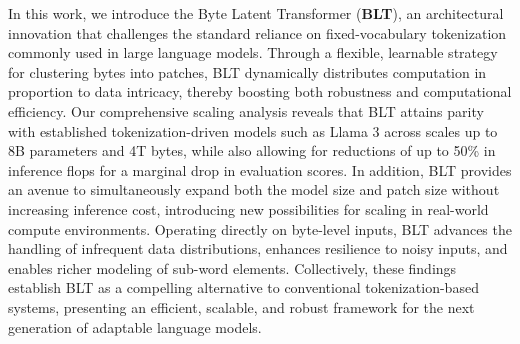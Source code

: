 In this work, we introduce the Byte Latent Transformer (\textbf{BLT}), an architectural innovation that challenges the standard reliance on fixed-vocabulary tokenization commonly used in large language models. Through a flexible, learnable strategy for clustering bytes into patches, {\textsc BLT} dynamically distributes computation in proportion to data intricacy, thereby boosting both robustness and computational efficiency. Our comprehensive scaling analysis reveals that {\textsc BLT} attains parity with established tokenization-driven models such as Llama 3 across scales up to 8B parameters and 4T bytes, while also allowing for reductions of up to 50\% in inference flops for a marginal drop in evaluation scores. In addition, {\textsc BLT} provides an avenue to simultaneously expand both the model size and patch size without increasing inference cost, introducing new possibilities for scaling in real-world compute environments. Operating directly on byte-level inputs, {\textsc BLT} advances the handling of infrequent data distributions, enhances resilience to noisy inputs, and enables richer modeling of sub-word elements. Collectively, these findings establish {\textsc BLT} as a compelling alternative to conventional tokenization-based systems, presenting an efficient, scalable, and robust framework for the next generation of adaptable language models.

